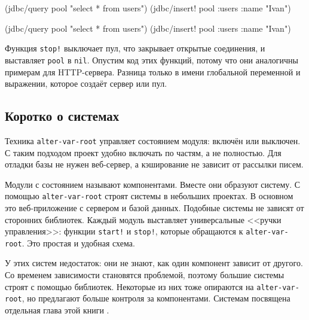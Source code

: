 \ifnarrow

\begin{english}
  \begin{clojure}
(jdbc/query pool "select * from users")
(jdbc/insert! pool
  :users {:name "Ivan"})
  \end{clojure}
\end{english}

\else

\begin{english}
  \begin{clojure}
(jdbc/query pool "select * from users")
(jdbc/insert! pool :users {:name "Ivan"})
  \end{clojure}
\end{english}

\fi

Функция \verb|stop!| выключает пул, что закрывает открытые соединения, и
выставляет \verb|pool| в \verb|nil|. Опустим код этих функций, потому что они
аналогичны примерам для HTTP-сервера. Разница только в имени глобальной
переменной и выражении, которое создаёт сервер или пул.

\subsection{Коротко о системах}


\label{systems-intro}

Техника \verb|alter-var-root| управляет состоянием модуля: включён или
выключен. С таким подходом проект удобно включать по частям, а не полностью. Для
отладки базы не нужен веб-сервер, а кэширование не зависит от рассылки писем.

Модули с состоянием называют компонентами. Вместе они образуют систему. С
помощью \verb|alter-var-root| строят системы в небольших проектах. В основном
это веб-приложение с сервером и базой данных. Подобные системы не зависят от
сторонних библиотек. Каждый модуль выставляет универсальные <<ручки
управления>>: функции \verb|start!| и \verb|stop!|, которые обращаются к
\verb|alter-var-root|. Это простая и удобная схема.

У этих систем недостаток: они не знают, как один компонент зависит от
другого. Со временем зависимости становятся проблемой, поэтому большие системы
строят с помощью библиотек. Некоторые из них тоже опираются на
\verb|alter-var-root|, но предлагают больше контроля за компонентами. Системам
посвящена отдельная глава этой книги .

